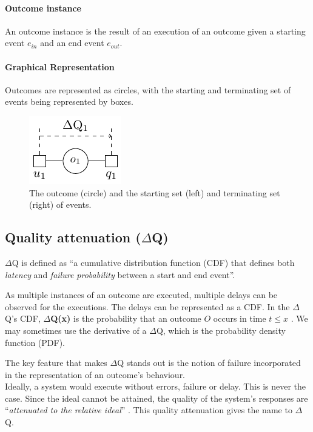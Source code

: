     \paragraph{Outcome instance}
    An outcome instance is the result of an execution of an outcome given a starting event $e_{in}$ and an end event $e_{out}$. \cite{art}

    \paragraph{Graphical Representation}
    Outcomes are represented as circles, with the starting and terminating set of events being represented by boxes. \cite{myo}
    \begin{figure}[H]
        \begin{center}
            \includegraphics[scale=1.2]{tikz/outdq.pdf}
        \end{center}
        \caption{The outcome (circle) and the starting set (left) and terminating set (right) of events.}
    \end{figure}

\subsection{Quality attenuation ($\Delta$Q)}
    $\Delta$Q is defined as ``a cumulative distribution function (CDF) that defines both \textit{latency} and \textit{failure probability} between a start and end event''. \cite{dq-tut}
    
        As multiple instances of an outcome are executed, multiple delays can be observed for the executions. The delays can be represented as a CDF. In the $\Delta$Q's CDF, \textbf{$\Delta$Q(x)} is the probability that an outcome $O$ occurs in time $t \le x$ \cite{art}.  We may sometimes use the derivative of a $\Delta$Q, which is the probability density function (PDF).

    The key feature that makes $\Delta$Q stands out is the notion of failure incorporated in the representation of an outcome's behaviour. \\
 Ideally, a system would execute without errors, failure or delay. This is never the case. Since the ideal cannot be attained, the quality of the system's responses are ``\textit{attenuated to the relative ideal}''  \cite{myo}. This quality attenuation gives the name to $\Delta$Q.

